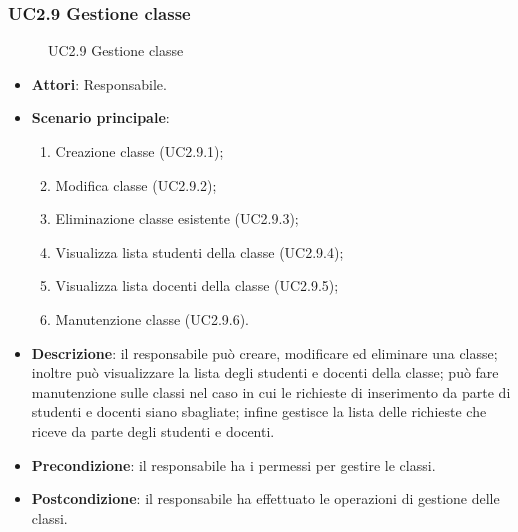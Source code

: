 \subsubsection{UC2.9 Gestione classe}
\begin{figure}[H]
\centering
\noindent{}
\caption{UC2.9 Gestione classe}
\end{figure}
\begin{itemize}
\item \textbf{Attori}: Responsabile.
\item \textbf{Scenario principale}:
\begin{enumerate}
\item Creazione classe (UC2.9.1);
\item Modifica classe (UC2.9.2);
\item Eliminazione classe esistente (UC2.9.3);
\item Visualizza lista studenti della classe (UC2.9.4);
\item Visualizza lista docenti della classe (UC2.9.5);
\item Manutenzione classe (UC2.9.6).
\end{enumerate}
\item \textbf{Descrizione}: il responsabile può creare, modificare ed eliminare una classe; inoltre può visualizzare la lista degli studenti e docenti della classe; può fare manutenzione sulle classi nel caso in cui le richieste di inserimento da parte di studenti e docenti siano sbagliate; infine gestisce la lista delle richieste che riceve da parte degli studenti e docenti.
\item \textbf{Precondizione}: il responsabile ha i permessi per gestire le classi.
\item \textbf{Postcondizione}: il responsabile ha effettuato le operazioni di gestione delle classi.
\end{itemize}
